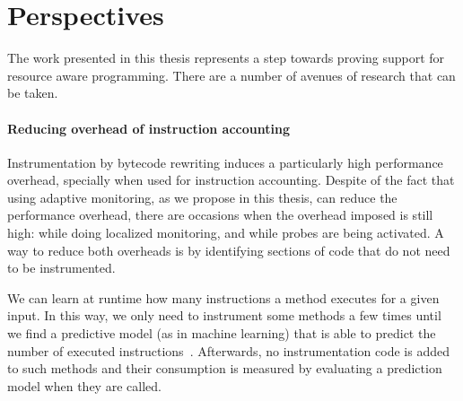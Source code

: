 \section{Perspectives}

The work presented in this thesis represents a step towards proving support for resource aware programming.
There are a number of avenues of research that can be taken. 



\paragraph{Reducing overhead of instruction accounting}

Instrumentation by bytecode rewriting induces a particularly high performance overhead, specially when used for instruction accounting.
Despite of the fact that using adaptive monitoring, as we propose in this thesis, can reduce the performance overhead, there are occasions when the overhead imposed is still high: while doing localized monitoring, and while probes are being activated.
A way to reduce both overheads is by identifying sections of code that do not need to be instrumented.

We can learn at runtime how many instructions a method executes for a given input.
In this way, we only need to instrument some methods a few times until we find a predictive model (as in machine learning) that is able to predict the number of executed instructions~\cite{tesauro2006hybrid}.
Afterwards, no instrumentation code is added to such methods and their consumption is measured by evaluating a prediction model when they are called.
 

